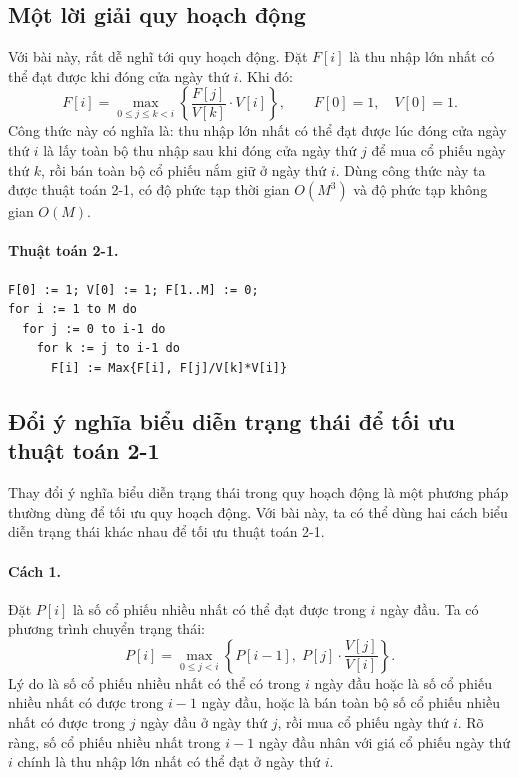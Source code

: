 \documentclass[11pt]{article}
\begin{document}
\subsection{Một lời giải quy hoạch động}

Với bài này, rất dễ nghĩ tới quy hoạch động. Đặt \(F[i]\) là thu nhập lớn
nhất có thể đạt được khi đóng cửa ngày thứ \(i\). Khi đó:
\[
  F[i] =
  \max_{0\le j\le k<i}\left\{ \frac{F[j]}{V[k]}\cdot V[i]\right\},
  \qquad F[0]=1,\quad V[0]=1.
\]
Công thức này có nghĩa là: thu nhập lớn nhất có thể đạt được lúc đóng cửa
ngày thứ \(i\) là lấy toàn bộ thu nhập sau khi đóng cửa ngày thứ \(j\) để mua
cổ phiếu ngày thứ \(k\), rồi bán toàn bộ cổ phiếu nắm giữ ở ngày thứ \(i\).
Dùng công thức này ta được thuật toán 2-1, có độ phức tạp thời gian
\(O(M^3)\) và độ phức tạp không gian \(O(M)\).

\paragraph{Thuật toán 2-1.}
\begin{verbatim}
F[0] := 1; V[0] := 1; F[1..M] := 0;
for i := 1 to M do
  for j := 0 to i-1 do
    for k := j to i-1 do
      F[i] := Max{F[i], F[j]/V[k]*V[i]}
\end{verbatim}

\subsection{Đổi ý nghĩa biểu diễn trạng thái để tối ưu thuật toán 2-1}

Thay đổi ý nghĩa biểu diễn trạng thái trong quy hoạch động là một phương pháp
thường dùng để tối ưu quy hoạch động. Với bài này, ta có thể dùng hai cách
biểu diễn trạng thái khác nhau để tối ưu thuật toán 2-1.

\paragraph{Cách 1.}
Đặt \(P[i]\) là số cổ phiếu nhiều nhất có thể đạt được trong \(i\) ngày đầu.
Ta có phương trình chuyển trạng thái:
\[
  P[i] = \max_{0\le j<i}\left\{ P[i-1],\; P[j]\cdot \frac{V[j]}{V[i]}\right\}.
\]
Lý do là số cổ phiếu nhiều nhất có thể có trong \(i\) ngày đầu hoặc là số cổ
phiếu nhiều nhất có được trong \(i-1\) ngày đầu, hoặc là bán toàn bộ số cổ
phiếu nhiều nhất có được trong \(j\) ngày đầu ở ngày thứ \(j\), rồi mua cổ
phiếu ngày thứ \(i\). Rõ ràng, số cổ phiếu nhiều nhất trong \(i-1\) ngày đầu
nhân với giá cổ phiếu ngày thứ \(i\) chính là thu nhập lớn nhất có thể đạt ở
ngày thứ \(i\).
\end{document}
